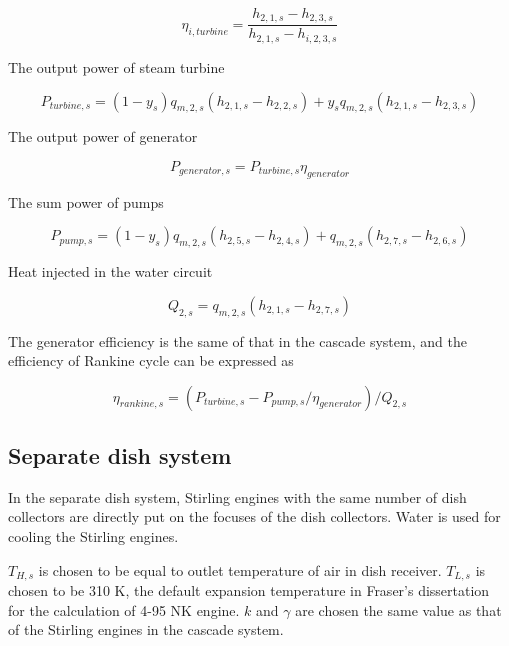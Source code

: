\documentclass{article}
\begin{document}
\begin{equation*}
	\eta_{i,turbine}=\frac{h_{2,1,s}-h_{2,3,s}}{h_{2,1,s}-h_{i,2,3,s}}
\end{equation*}

The output power of steam turbine

\begin{equation*}
	P_{turbine,s}=\left(1-y_{s}\right)q_{m,2,s}\left(h_{2,1,s}-h_{2,2,s}\right)+y_{s}q_{m,2,s}\left(h_{2,1,s}-h_{2,3,s}\right)
\end{equation*}

The output power of generator

\begin{equation*}
	P_{generator,s}=P_{turbine,s}\eta_{generator}
\end{equation*}

The sum power of pumps

\begin{equation*}
	P_{pump,s}=\left(1-y_{s}\right)q_{m,2,s}\left(h_{2,5,s}-h_{2,4,s}\right)+q_{m,2,s}\left(h_{2,7,s}-h_{2,6,s}\right)
\end{equation*}

Heat injected in the water circuit

\begin{equation*}
	Q_{2,s}=q_{m,2,s}\left(h_{2,1,s}-h_{2,7,s}\right)
\end{equation*}

The generator efficiency is the same of that in the cascade system, and the efficiency of Rankine cycle can be expressed as

\begin{equation*}
	\eta_{rankine,s}=(P_{turbine,s}-P_{pump,s}/\eta_{generator})/Q_{2,s}
\end{equation*}

\subsection{Separate dish system}

In the separate dish system, Stirling engines with the same number of dish collectors are directly put on the focuses of the dish collectors. Water is used for cooling the Stirling engines.

$T_{H,s}$ is chosen to be equal to outlet temperature of air in dish receiver. $T_{L,s}$ is chosen to be 310 K, the default expansion temperature in Fraser's dissertation~\cite{Fraser2008} for the calculation of 4-95 NK\uppercase\expandafter{} engine. $k$ and $\gamma$ are chosen the same value as that of the Stirling engines in the cascade system.
\end{document}
